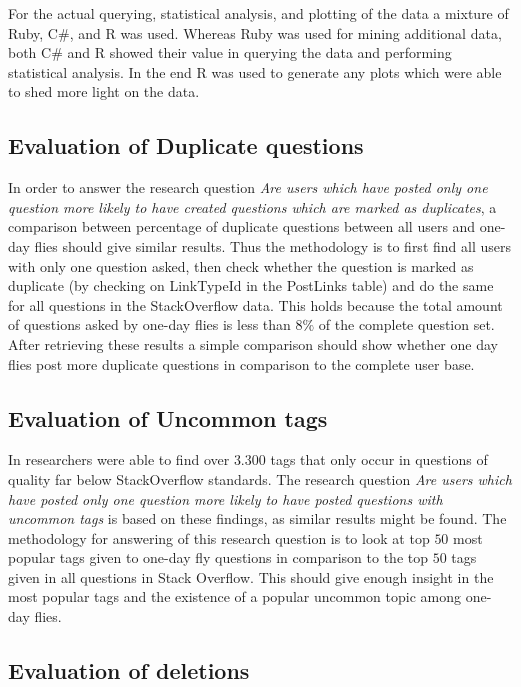 \documentclass[conference]{IEEEtran}
\begin{document}
For the actual querying, statistical analysis, and plotting of the data a mixture of Ruby, C\#, and R was used. Whereas Ruby was used for mining additional data,  both C\# and R showed their value in querying the data and performing statistical analysis. In the end R was used to generate any plots which were able to shed more light on the data.


\subsection{Evaluation of Duplicate questions}
In order to answer the research question \textit{Are users which have posted only one question more likely to have created questions which are marked as duplicates}, a comparison between percentage of duplicate questions  between all users and one-day flies should give similar results. Thus the methodology is to first find all users with only one question asked, then check whether the question is marked as duplicate (by checking on  LinkTypeId in the PostLinks table) and do the same for all questions in the StackOverflow data. This holds because the total amount of questions asked by one-day flies is less than $8\%$ of the complete question set. After retrieving these results a simple comparison should show whether one day flies post more duplicate questions in comparison to the complete user base.

\subsection{Evaluation of Uncommon tags}
In \cite{correa2014chaff} researchers were able to find over $3.300$ tags that only occur in questions of quality far below StackOverflow standards. The research question \textit{Are users which have posted only one question more likely to have posted questions with uncommon tags} is based on these findings, as similar results might be found. The methodology for answering of this research question is to look at top $50$ most popular tags given to one-day fly questions in comparison to the top $50$ tags given in all questions in Stack Overflow. This should give enough insight in the most popular tags and the existence of a popular uncommon topic among one-day flies.

\subsection{Evaluation of deletions}
\end{document}
